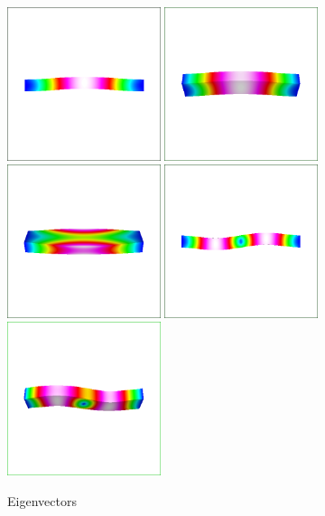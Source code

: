 \begin{figure}[h!]
\begin{center}
  \includegraphics[width=0.4\textwidth,angle=0]{eig1}
  \includegraphics[width=0.4\textwidth,angle=0]{eig2}
  \includegraphics[width=0.4\textwidth,angle=0]{eig3}
  \includegraphics[width=0.4\textwidth,angle=0]{eig4}
  \includegraphics[width=0.4\textwidth,angle=0]{eig5}
  \caption{Eigenvectors}
  \label{fig:eig12345}
\end{center}
\end{figure}

\vfill
